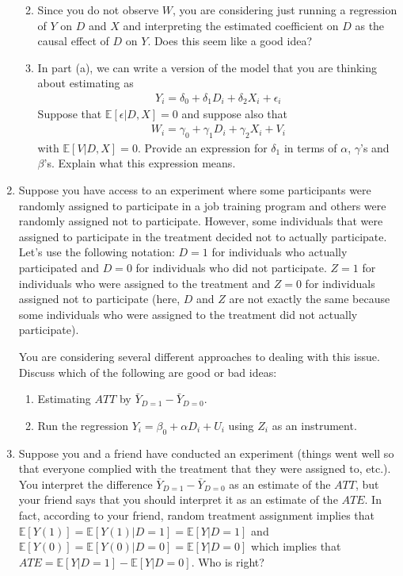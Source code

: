\documentclass[
  letterpaper,
  DIV=11,
  numbers=noendperiod]{scrreprt}
\begin{document}
\begin{enumerate}
  \begin{enumerate}
  \def\labelenumii{\alph{enumii})}
  \item
    Since you do not observe \(W\), you are considering just running a
    regression of \(Y\) on \(D\) and \(X\) and interpreting the
    estimated coefficient on \(D\) as the causal effect of \(D\) on
    \(Y\). Does this seem like a good idea?
  \item
    In part (a), we can write a version of the model that you are
    thinking about estimating as \begin{align*}
       Y_i = \delta_0 + \delta_1 D_i + \delta_2 X_i + \epsilon_i
     \end{align*} Suppose that \(\mathbb{E}[\epsilon | D, X] = 0\) and
    suppose also that \begin{align*}
    W_i = \gamma_0 + \gamma_1 D_i + \gamma_2 X_i + V_i
      \end{align*} with \(\mathbb{E}[V|D,X]=0\). Provide an expression
    for \(\delta_1\) in terms of \(\alpha\), \(\gamma\)'s and
    \(\beta\)'s. Explain what this expression means.
  \end{enumerate}
\item
  Suppose you have access to an experiment where some participants were
  randomly assigned to participate in a job training program and others
  were randomly assigned not to participate. However, some individuals
  that were assigned to participate in the treatment decided not to
  actually participate. Let's use the following notation: \(D=1\) for
  individuals who actually participated and \(D=0\) for individuals who
  did not participate. \(Z=1\) for individuals who were assigned to the
  treatment and \(Z=0\) for individuals assigned not to participate
  (here, \(D\) and \(Z\) are not exactly the same because some
  individuals who were assigned to the treatment did not actually
  participate).

  You are considering several different approaches to dealing with this
  issue. Discuss which of the following are good or bad ideas:

  \begin{enumerate}
  \def\labelenumii{\alph{enumii})}
  \item
    Estimating \(ATT\) by \(\bar{Y}_{D=1} - \bar{Y}_{D=0}\).
  \item
    Run the regression \(Y_i = \beta_0 + \alpha D_i + U_i\) using
    \(Z_i\) as an instrument.
  \end{enumerate}
\item
  Suppose you and a friend have conducted an experiment (things went
  well so that everyone complied with the treatment that they were
  assigned to, etc.). You interpret the difference
  \(\bar{Y}_{D=1} - \bar{Y}_{D=0}\) as an estimate of the \(ATT\), but
  your friend says that you should interpret it as an estimate of the
  \(ATE\). In fact, according to your friend, random treatment
  assignment implies that
  \(\mathbb{E}[Y(1)] = \mathbb{E}[Y(1)|D=1] = \mathbb{E}[Y|D=1]\) and
  \(\mathbb{E}[Y(0)] = \mathbb{E}[Y(0)|D=0] = \mathbb{E}[Y|D=0]\) which
  implies that \(ATE = \mathbb{E}[Y|D=1] - \mathbb{E}[Y|D=0]\). Who is
  right?
\end{enumerate}
\end{document}
